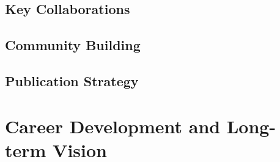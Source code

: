 \documentclass[11pt,a4paper]{article}
\begin{document}
    
    \subsection{Key Collaborations}
    
    
    
    
    \subsection{Community Building}
    
    
    
    \subsection{Publication Strategy}
    
\section{Career Development and Long-term Vision}
\label{sec:career}
\end{document}
